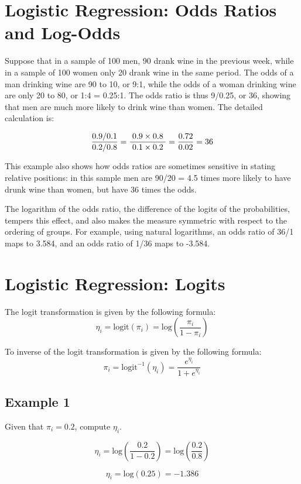 \documentclass[]{report}
\begin{document}
\newpage
\section{Logistic Regression: Odds Ratios and Log-Odds}
Suppose that in a sample of 100 men, 90 drank wine in the previous week, while in a sample of 100 women only 20 drank wine in the same period. The odds of a man drinking wine are 90 to 10, or 9:1, while the odds of a woman drinking wine are only 20 to 80, or 1:4 = 0.25:1. The odds ratio is thus 9/0.25, or 36, showing that men are much more likely to drink wine than women. The detailed calculation is:

\[ { 0.9/0.1 \over 0.2/0.8}=\frac{\;0.9\times 0.8\;}{\;0.1\times 0.2\;} ={0.72 \over 0.02} = 36 \]

This example also shows how odds ratios are sometimes sensitive in stating relative positions: in this sample men are 90/20 = 4.5 times more likely to have drunk wine than women, but have 36 times the odds. 


The logarithm of the odds ratio, the difference of the logits of the probabilities, tempers this effect, and also makes the measure symmetric with respect to the ordering of groups. For example, using natural logarithms, an odds ratio of 36/1 maps to 3.584, and an odds ratio of 1/36 maps to -3.584.


\section{Logistic Regression: Logits}

The logit transformation is given by the following formula: 
\[ \eta_i = \mbox{logit}(\pi_i)  = \mbox{log}\left( \frac{\pi_i}{1- \pi_i} \right) \]

To inverse of the logit transformation is given by the following formula: 
\[ \pi_i = \mbox{logit}^{-1}(\eta_i)  =  \frac{e^{\eta_i}}{1 + e^{\eta_i}} \]

\subsection{Example 1}
Given that $\pi_i = 0.2$, compute $\eta_i$.

\[ \eta_i = \mbox{log}\left( \frac{0.2}{1-0.2} \right)= \mbox{log}\left( \frac{0.2}{0.8} \right)\] 

\[ \eta_i =  \mbox{log}(0.25) =-1.386 \]
\end{document}
